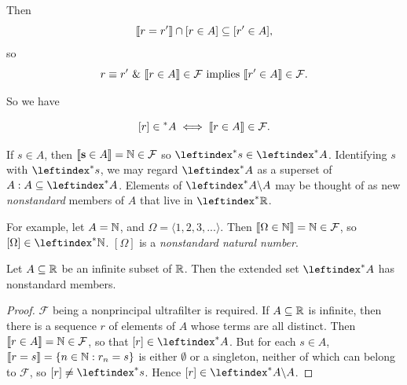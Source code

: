 Then
\[
\llbracket r = r' \rrbracket \cap [r \in A] \subseteq [r' \in A],
\]
so
\[
r \equiv r' \ \&\ \llbracket r \in A\rrbracket \in \mathcal{F} \text{ implies } \llbracket r' \in A\rrbracket \in \mathcal{F}.
\]

So we have

$$
[ r] \in {}^*A \iff \llbracket r \in A\rrbracket \in \mathcal{F}.
$$

If $s \in A$, then $\llbracket \mathbf{s} \in A\rrbracket=\mathbb{N} \in \mathcal{F}$ so $\str{s} \in \str{A}$. Identifying $s$ with $\str{s}$, we may regard $\str{A}$ as a superset of $A: A \subseteq \str{A}$. Elements of $\str{A} \backslash A$ may be thought of as new \textit{nonstandard} members of $A$ that live in $\Rns$. 

For example, let $A=\mathbb{N}$, and $\Omega=\langle 1,2,3,... \rangle$. Then $\llbracket \Omega \in \mathbb{N}\rrbracket=\mathbb{N} \in \mathcal{F}$, so $[\Omega] \in \Nns$. $[\Omega]$ is a \textit{nonstandard natural number}.

\begin{thm}
    Let $A \subseteq \mathbb{R}$ be an infinite subset of $\mathbb{R}$. Then the extended set $\str{A}$ has nonstandard members.
\end{thm}
\begin{proof}
    $\mathcal{F}$ being a nonprincipal ultrafilter is required. If $A \subseteq \mathbb{R}$ is infinite, then there is a sequence $r$ of elements of $A$ whose terms are all distinct. Then $\llbracket r \in A \rrbracket= \mathbb{N} \in \mathcal{F}$, so that $[r] \in \str{A}$. But for each $s \in A$, $\llbracket r = s\rrbracket=\{n \in \mathbb{N}: r_n = s\}$ is either $\emptyset$ or a singleton, neither of which can belong to $\mathcal{F}$, so $[r] \neq \str{s}$. Hence $[r] \in \str{A} \backslash A$.
\end{proof}
